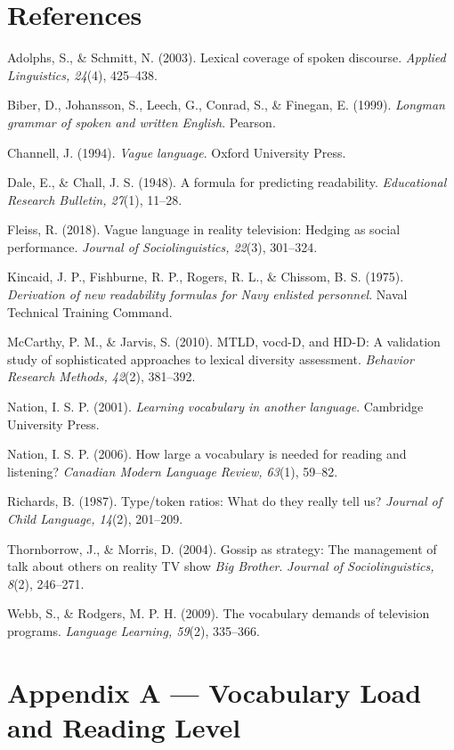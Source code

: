 \documentclass[11pt]{article}
\begin{document}
\section*{References}

Adolphs, S., \& Schmitt, N. (2003). Lexical coverage of spoken discourse. \emph{Applied Linguistics, 24}(4), 425--438.

Biber, D., Johansson, S., Leech, G., Conrad, S., \& Finegan, E. (1999). \emph{Longman grammar of spoken and written English}. Pearson.

Channell, J. (1994). \emph{Vague language}. Oxford University Press.

Dale, E., \& Chall, J. S. (1948). A formula for predicting readability. \emph{Educational Research Bulletin, 27}(1), 11--28.

Fleiss, R. (2018). Vague language in reality television: Hedging as social performance. \emph{Journal of Sociolinguistics, 22}(3), 301--324.

Kincaid, J. P., Fishburne, R. P., Rogers, R. L., \& Chissom, B. S. (1975). \emph{Derivation of new readability formulas for Navy enlisted personnel}. Naval Technical Training Command.

McCarthy, P. M., \& Jarvis, S. (2010). MTLD, vocd-D, and HD-D: A validation study of sophisticated approaches to lexical diversity assessment. \emph{Behavior Research Methods, 42}(2), 381--392.

Nation, I. S. P. (2001). \emph{Learning vocabulary in another language}. Cambridge University Press.

Nation, I. S. P. (2006). How large a vocabulary is needed for reading and listening? \emph{Canadian Modern Language Review, 63}(1), 59--82.

Richards, B. (1987). Type/token ratios: What do they really tell us? \emph{Journal of Child Language, 14}(2), 201--209.

Thornborrow, J., \& Morris, D. (2004). Gossip as strategy: The management of talk about others on reality TV show \emph{Big Brother}. \emph{Journal of Sociolinguistics, 8}(2), 246--271.

Webb, S., \& Rodgers, M. P. H. (2009). The vocabulary demands of television programs. \emph{Language Learning, 59}(2), 335--366.


\section*{Appendix A --- Vocabulary Load and Reading Level}
\end{document}
